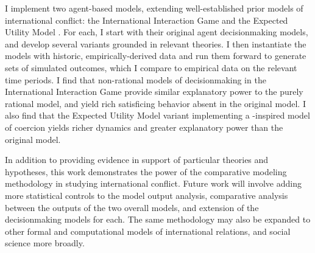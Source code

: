 \documentclass[11 pt]{report}
\begin{document}
I implement two agent-based models, extending well-established prior models of international conflict: the International Interaction Game \citep{bdm_1992} and the Expected Utility Model \citep{bdm_2002}. For each, I start with their original agent decisionmaking models, and develop several variants grounded in relevant theories. I then instantiate the models with historic, empirically-derived data and run them forward to generate sets of simulated outcomes, which I compare to empirical data on the relevant time periods. I find that non-rational models of decisionmaking in the International Interaction Game provide similar explanatory power to the purely rational model, and yield rich satisficing behavior absent in the original model. I also find that the Expected Utility Model variant implementing a \citet{schelling_1966}-inspired model of coercion yields richer dynamics and greater explanatory power than the original model.

In addition to providing evidence in support of particular theories and hypotheses, this work demonstrates the power of the comparative modeling methodology in studying international conflict. Future work will involve adding more statistical controls to the model output analysis, comparative analysis between the outputs of the two overall models, and extension of the decisionmaking models for each. The same methodology may also be expanded to other formal and computational models of international relations, and social science more broadly.



\startofchapters















\end{document}
